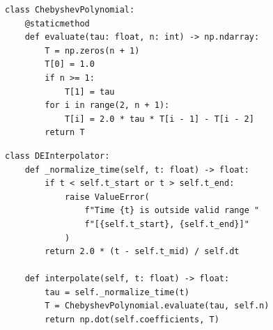 \documentclass[12pt,a4paper]{article}
\begin{document}
\begin{lstlisting}[caption={切比雪夫多项式类}]
class ChebyshevPolynomial:
    @staticmethod
    def evaluate(tau: float, n: int) -> np.ndarray:
        T = np.zeros(n + 1)
        T[0] = 1.0
        if n >= 1:
            T[1] = tau
        for i in range(2, n + 1):
            T[i] = 2.0 * tau * T[i - 1] - T[i - 2]
        return T
\end{lstlisting}

\begin{lstlisting}[caption={DE 插值器类（含边界检查）}]
class DEInterpolator:
    def _normalize_time(self, t: float) -> float:
        if t < self.t_start or t > self.t_end:
            raise ValueError(
                f"Time {t} is outside valid range "
                f"[{self.t_start}, {self.t_end}]"
            )
        return 2.0 * (t - self.t_mid) / self.dt
    
    def interpolate(self, t: float) -> float:
        tau = self._normalize_time(t)
        T = ChebyshevPolynomial.evaluate(tau, self.n)
        return np.dot(self.coefficients, T)
\end{lstlisting}
\end{document}

